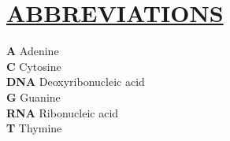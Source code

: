 \section*{\uline{ABBREVIATIONS}}
\fontsize{13}{20}\selectfont 

\textbf{A}  \hspace{1cm}  Adenine \\
\noindent \textbf{C} \hspace{1cm}  Cytosine \\
\noindent \textbf{DNA} \hspace{0.4cm}  Deoxyribonucleic acid\\
\noindent \textbf{G} \hspace{1cm}  Guanine\\
\noindent \textbf{RNA} \hspace{0.4cm}  Ribonucleic acid\\
\noindent \textbf{T} \hspace{1cm}  Thymine\\
\pagebreak


\clearpage\mbox{}\clearpage